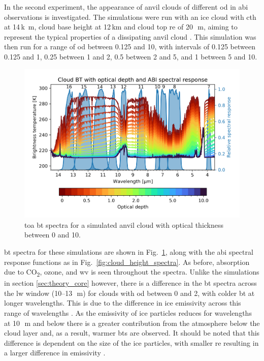 In the second experiment, the appearance of anvil clouds of different \acrfull{od} in \acrshort{abi} observations is investigated.
The simulations were run with an ice cloud with \acrshort{cth} at 14\,\unit{k m}, cloud base height at 12\,\unit{km} and cloud top \acrshort{re} of 20\,\unit{\mu m}, aiming to represent the typical properties of a dissipating anvil cloud \citep{sokol_tropical_2020}.
This simulation was then run for a range of \acrshort{od} between 0.125 and 10, with intervals of 0.125 between 0.125 and 1, 0.25 between 1 and 2, 0.5 between 2 and 5, and 1 between 5 and 10.

\begin{figure}[tp]
    \includegraphics[width=\textwidth]{figures/chapter1_08.png}
    \caption[
    \acrshort{toa} \acrshort{bt} spectra for a simulated anvil cloud with optical thickness between 0 and 10
    ]{
    \acrshort{toa} \acrshort{bt} spectra for a simulated anvil cloud with optical thickness between 0 and 10. 
    }
    \label{fig:optical_depth_spectra}
\end{figure}

\acrshort{bt} spectra for these simulations are shown in Fig.~\ref{fig:optical_depth_spectra}, along with the \acrshort{abi} spectral response functions as in Fig.~\ref{fig:cloud_height_spectra}.
As before, absorption due to CO\textsubscript{2}, ozone, and \acrshort{wv} is seen throughout the spectra.
Unlike the simulations in section \ref{sec:theory_core} however, there is a difference in the \acrshort{bt} spectra across the \acrshort{lw} window (10--13\,\unit{\mu m}) for clouds with \acrshort{od} between 0 and 2, with colder \acrshort{bt} at longer wavelengths.
This is due to the difference in ice emissivity across this range of wavelengths \citep{fu_radiation_2015}.
As the emissivity of ice particles reduces for wavelengths at 10\,\unit{\mu m} and below there is a greater contribution from the atmosphere below the cloud layer and, as a result, warmer \acrshort{bt}s are observed.
It should be noted that this difference is dependent on the size of the ice particles, with smaller \acrshort{re} resulting in a larger difference in emissivity \citep{dubuisson_sensitivity_2008}.


